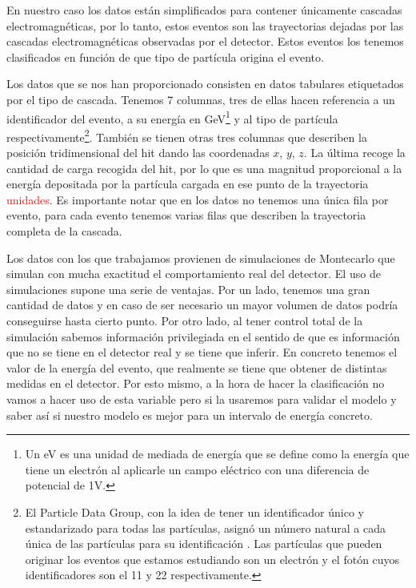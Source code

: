\documentclass[a4paper,12pt,twoside,titlepage]{article}
\newcommand{\red}[1]{\textcolor{red}{#1}}
\begin{document}
En nuestro caso los datos están simplificados para contener únicamente cascadas electromagnéticas, por lo tanto, estos eventos son las trayectorias dejadas por las cascadas electromagnéticas observadas por el detector. Estos eventos los tenemos clasificados en función de que tipo de partícula origina el evento.


Los datos que se nos han proporcionado consisten en datos tabulares etiquetados por el tipo de cascada. Tenemos 7 columnas, tres de ellas hacen referencia a un identificador del evento, a su energía en GeV\footnote{Un eV es una unidad de mediada de energía que se define como la energía que tiene un electrón al aplicarle un campo eléctrico con una diferencia de potencial de 1V.} y al tipo de partícula respectivamente\footnote{El Particle Data Group, con la idea de tener un identificador único y estandarizado para todas las partículas, asignó un número natural a cada única de las partículas para su identificación \cite{datagroup}. Las partículas que pueden originar los eventos que estamos estudiando son un electrón y el fotón cuyos identificadores son el 11 y 22 respectivamente.}.  También se tienen otras tres columnas que describen la posición tridimensional del hit dando las coordenadas $x$, $y$, $z$. La última recoge la cantidad de carga recogida del hit, por lo que es una magnitud proporcional a la energía depositada por la partícula cargada en ese punto de la trayectoria \red{unidades}. Es importante notar que en los datos no tenemos una única fila por evento, para cada evento tenemos varias filas que describen la trayectoria completa de la cascada.

Los datos con los que trabajamos provienen de simulaciones de Montecarlo que simulan con mucha exactitud el comportamiento real del detector. El uso de simulaciones supone una serie de ventajas. Por un lado, tenemos una gran cantidad de datos y en caso de ser necesario un mayor volumen de datos podría conseguirse hasta cierto punto. Por otro lado, al tener control total de la simulación sabemos información privilegiada en el sentido de que es información que no se tiene en el detector real y se tiene que inferir. En concreto tenemos el valor de la energía del evento, que realmente se tiene que obtener de distintas medidas en el detector. Por esto mismo, a la hora de hacer la clasificación no vamos a hacer uso de esta variable pero si la usaremos para validar el modelo y saber así si nuestro modelo es mejor para un intervalo de energía concreto.
\end{document}
